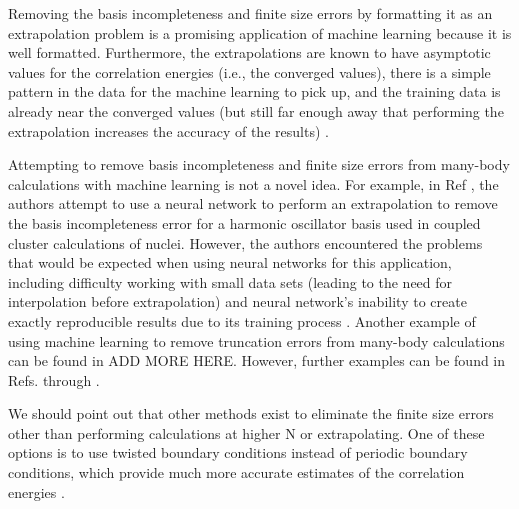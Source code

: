 


Removing the basis incompleteness and finite size errors by formatting it as an extrapolation problem is a promising application of machine learning because it is well formatted. Furthermore, the extrapolations are known to have asymptotic values for the correlation energies (i.e., the converged values), there is a simple pattern in the data for the machine learning to pick up, and the training data is already near the converged values (but still far enough away that performing the extrapolation increases the accuracy of the results) \cite{Ref6}.

Attempting to remove basis incompleteness and finite size errors from many-body calculations with machine learning is not a novel idea. For example, in Ref \cite{Ref6}, the authors attempt to use a neural network to perform an extrapolation to remove the basis incompleteness error for a harmonic oscillator basis used in coupled cluster calculations of nuclei. However, the authors encountered the problems that would be expected when using neural networks for this application, including difficulty working with small data sets (leading to the need for interpolation before extrapolation) and neural network's inability to create exactly reproducible results due to its training process \cite{Ref6}. Another example of using machine learning to remove truncation errors from many-body calculations can be found in ADD MORE HERE. However, further examples can be found in Refs. \cite{ADD NUMBER} through \cite{ADD NUMBER}.

We should point out that other methods exist to eliminate the finite size errors other than performing calculations at higher N or extrapolating. One of these options is to use twisted boundary conditions instead of periodic boundary conditions, which provide much more accurate estimates of the correlation energies \cite{Ref4}.